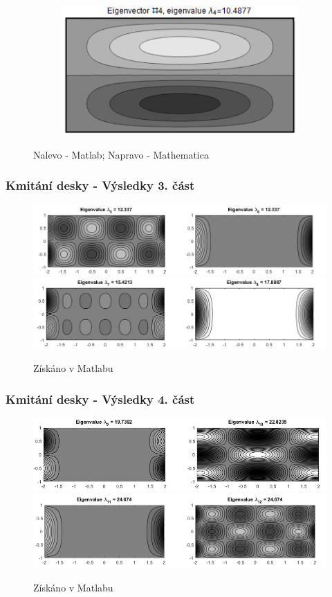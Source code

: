 \documentclass[xcolor=table]{beamer}
\begin{document}
\begin{frame}
\begin{figure}
\begin{subfigure}{.5\textwidth}
\includegraphics[width=.95\linewidth]{rectangle-eigenvector-4.png}
\end{subfigure}
\caption{Nalevo - Matlab; Napravo - Mathematica}
\end{figure}
\end{frame}

\begin{frame}
\frametitle{Kmitání desky - Výsledky 3. část}
\centering
\begin{figure}
\includegraphics[width=1\linewidth]{obdelnicky3.png}
\includegraphics[width=1\linewidth]{obdelnicky4.png}
\caption{Získáno v Matlabu}
\end{figure}
\end{frame}

\begin{frame}
\frametitle{Kmitání desky - Výsledky 4. část}
\centering
\begin{figure}
\includegraphics[width=1\linewidth]{obdelnicky5.png}
\includegraphics[width=1\linewidth]{obdelnicky6.png}
\caption{Získáno v Matlabu}
\end{figure}
\end{frame}
\end{document}
